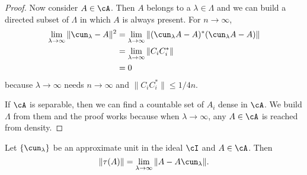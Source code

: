 \begin{proof}
	Now consider $A\in\cA$. Then $A$ belongs to a $\lambda\in\Lambda$ and we can build a directed subset of $\Lambda$ in which $A$ is always present. For $n\to\infty$,
	\begin{equation}
		\begin{split}
			\lim_{\lambda\to\infty}\| \cun_{\lambda}-A \|^2&=\lim_{\lambda\to\infty}\| (\cun_{\lambda}A-A)^*(\cun_{\lambda}A-A) \|\\
			&=\lim_{\lambda\to\infty}\| C_iC_i^* \|\\
			&=0
		\end{split}
	\end{equation}
	because $\lambda\to\infty$ needs $n\to\infty$ and $\| C_iC_i^* \|\leq 1/4n$.

	If $\cA$ is separable, then we can find a countable set of $A_i$ dense in $\cA$. We build $\Lambda$ from them and the proof works because when $\lambda\to\infty$, any $A\in\cA$ is reached from density.

\end{proof}


\begin{lemma} \label{lem:taulimA}
	Let $\{ \cun_{\lambda} \}$ be an approximate unit in the ideal $\cI$ and $A\in\cA$. Then
	\begin{equation}
		\| \tau(A)\|=\lim_{\lambda\to\infty}\| A-A\cun_{\lambda} \|.
	\end{equation}

\end{lemma}


